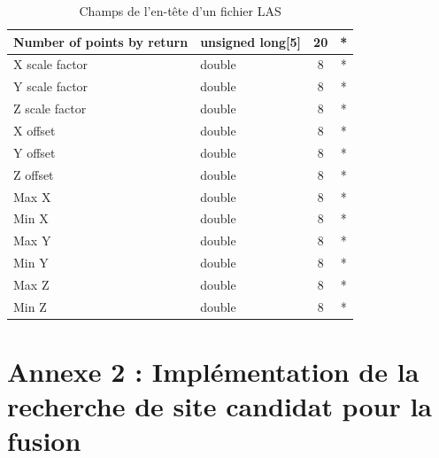 \begin{table}[htpb!]
\begin{tabular}{|l|l|c|c|}
Number of points by return           & unsigned long{[}5{]}     & 20    & * \\ \hline
X scale factor                       & double                   & 8     & * \\ \hline
Y scale factor                       & double                   & 8     & * \\ \hline
Z scale factor                       & double                   & 8     & * \\ \hline
X offset                             & double                   & 8     & * \\ \hline
Y offset                             & double                   & 8     & * \\ \hline
Z offset                             & double                   & 8     & * \\ \hline
Max X                                & double                   & 8     & * \\ \hline
Min X                                & double                   & 8     & * \\ \hline
Max Y                                & double                   & 8     & * \\ \hline
Min Y                                & double                   & 8     & * \\ \hline
Max Z                                & double                   & 8     & * \\ \hline
Min Z                                & double                   & 8     & * \\ \hline
\end{tabular}
\caption[Champs de l'en-tête d'un fichier LAS]{Champs de l'en-tête d'un fichier LAS}
\label{tab:las_header}
\end{table}

\chapter*{Annexe 2 : Implémentation de la recherche de site candidat pour la fusion}

